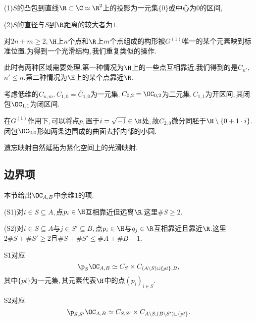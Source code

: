 (1)$S$的凸包到直线$\R\subset \C\simeq \R^2$上的投影为一元集$\{0\}$或中心为$0$的区间,\,

(2)$S$的直径与$S$到$\R$距离的较大者为$1$.

对$2n+m\ge 2$,\,$\H$上$n$个点和$\R$上$m$个点组成的构形被$G^{(1)}$唯一的某个元素映到标准位置.为得到一个光滑结构,\,我们重复类似的操作.

此时有两种区域需要处理.第一种情况为$\H$上的一些点互相靠近.我们得到的是${\overline C}_{n'}$,\,$n'\le n$.第二种情况为$\H$上的某个点靠近$\R$.

考虑低维的$C_{n,m}$.\,$C_{1,0}={\overline C}_{1,0}$为一元集.\,$C_{0,2}=\OC_{0,2}$为二元集.\,$C_{1,1}$为开区间,\,其闭包$\OC_{1,1}$为闭区间.

在$G^{(1)}$作用下,\,可以将点$p_1$置于$i=\sqrt{-1}\in \H$处,\,故$C_{2,0}$微分同胚于$\H\setminus \{0+1\cdot i\}$.闭包$\OC_{2,0}$形如两条边围成的曲面去掉内部的小圆.

遗忘映射自然延拓为紧化空间上的光滑映射.


\subsection{边界项}
本节给出$\OC_{A,B}$中余维$1$的项.

(S1)对$i\in S\subseteq A$,\,点$p_i\in\H$互相靠近但远离$\R$.这里$\#S\ge 2$.

(S2)对$i\in S\subseteq A$与$j\in S'\subseteq B$,\,点$p_i\in \H$与$q_j\in\R$互相靠近且靠近$\R$.这里$2\#S+\# S'\ge 2$且$\#S+\#S'\le \#A+\#B-1$.

S1对应
$$\p_S \OC_{A,B}\simeq
                C_{S}\times C_{(A
               \setminus S)\sqcup \{pt\}, B},$$
其中$\{pt\}$为一元集,\,其元素代表$\H$中的点$(p_i)_{i\in S}$.

S2对应
$$\p_{S,S'} \OC_{A,B}\simeq
                 C_{S,S'}\times C_{A\setminus S,
                  (B\setminus S')\sqcup
                  \{pt\} }.$$











